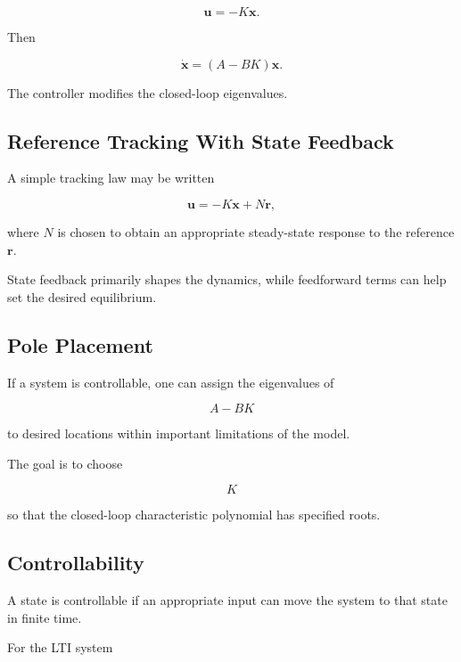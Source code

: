 \[
\boxed{
\mathbf{u}
=
-K\mathbf{x}.
}
\]

Then

\[
\boxed{
\dot{\mathbf{x}}
=
(A-BK)\mathbf{x}.
}
\]

The controller modifies the closed-loop eigenvalues.

\subsection{Reference Tracking With State Feedback}
\label{subsec:state-feedback-reference}

A simple tracking law may be written

\[
\boxed{
\mathbf{u}
=
-K\mathbf{x}
+
N\mathbf{r},
}
\]

where \(N\) is chosen to obtain an appropriate steady-state response to the
reference \(\mathbf{r}\).

State feedback primarily shapes the dynamics, while feedforward terms can
help set the desired equilibrium.

\subsection{Pole Placement}
\label{subsec:pole-placement}

If a system is controllable, one can assign the eigenvalues of

\[
A-BK
\]

to desired locations within important limitations of the model.

The goal is to choose

\[
\boxed{
K
}
\]

so that the closed-loop characteristic polynomial has specified roots.

\subsection{Controllability}
\label{subsec:controllability}

A state is controllable if an appropriate input can move the system to that
state in finite time.

For the LTI system

